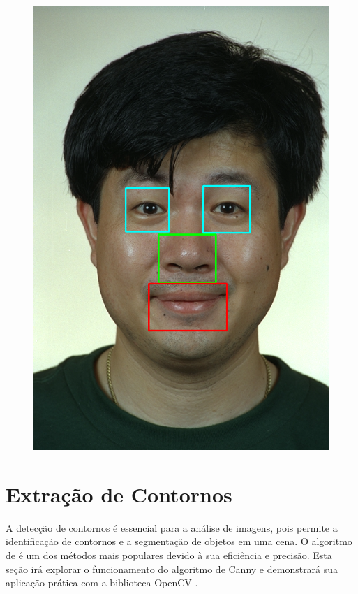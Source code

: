 \begin{figure}[h!]
\begin{minipage}[b]{0.33\textwidth}
        \includegraphics[width=0.9\linewidth]{fig/02_detected_features.png}
        \label{fig:caracteristicas}
    \end{minipage}
    \label{fig:deteccao-caracteristicas}
\end{figure}



\section{Extração de Contornos}

A detecção de contornos é essencial para a análise de imagens, pois permite a identificação de contornos e a segmentação de objetos em uma cena. O algoritmo de \citet{Canny} é um dos métodos mais populares devido à sua eficiência e precisão. Esta seção irá explorar o funcionamento do algoritmo de Canny e demonstrará sua aplicação prática com a biblioteca OpenCV \cite{CannyAplicacao}.

